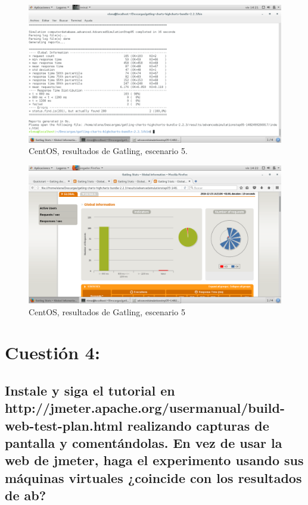 \begin{figure}[H] 
	\centering
	\includegraphics[width=14.7cm]{./img/opcional1_7.png} 	
	\caption{CentOS, resultados de Gatling, escenario 5.} \label{fig:opcional1_7}
\end{figure}

\begin{figure}[H] 
	\centering
	\includegraphics[width=14.7cm]{./img/opcional1_8.png} 	
	\caption{CentOS, resultados de Gatling, escenario 5} \label{fig:opcional1_8}
\end{figure}



\section{Cuestión 4:}

\subsection{Instale y siga el tutorial en http://jmeter.apache.org/usermanual/build-web-test-plan.html \cite{ejer4} realizando capturas de pantalla y comentándolas. En vez de usar la web de jmeter, haga el experimento usando sus máquinas virtuales ¿coincide con los resultados de ab?}

